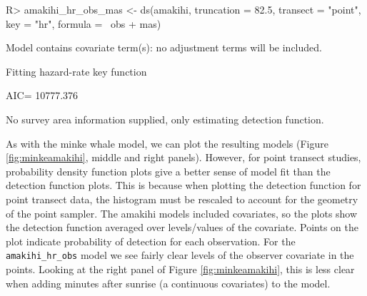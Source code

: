 \documentclass[article,shortnames]{jss}
\begin{document}
\begin{CodeChunk}
\begin{CodeInput}
R> amakihi_hr_obs_mas <- ds(amakihi, truncation = 82.5, transect = "point",
                         key = "hr", formula = ~obs + mas)
\end{CodeInput}
\begin{CodeOutput}
Model contains covariate term(s): no adjustment terms will be included.
\end{CodeOutput}
\begin{CodeOutput}
Fitting hazard-rate key function
\end{CodeOutput}
\begin{CodeOutput}
AIC= 10777.376
\end{CodeOutput}
\begin{CodeOutput}
No survey area information supplied, only estimating detection function.
\end{CodeOutput}
\end{CodeChunk}

As with the minke whale model, we can plot the resulting models (Figure
\ref{fig:minkeamakihi}, middle and right panels). However, for point
transect studies, probability density function plots give a better sense
of model fit than the detection function plots. This is because when
plotting the detection function for point transect data, the histogram
must be rescaled to account for the geometry of the point sampler. The
amakihi models included covariates, so the plots show the detection
function averaged over levels/values of the covariate. Points on the
plot indicate probability of detection for each observation. For the
\texttt{amakihi\_hr\_obs} model we see fairly clear levels of the
observer covariate in the points. Looking at the right panel of Figure
\ref{fig:minkeamakihi}, this is less clear when adding minutes after
sunrise (a continuous covariates) to the model.
\end{document}

